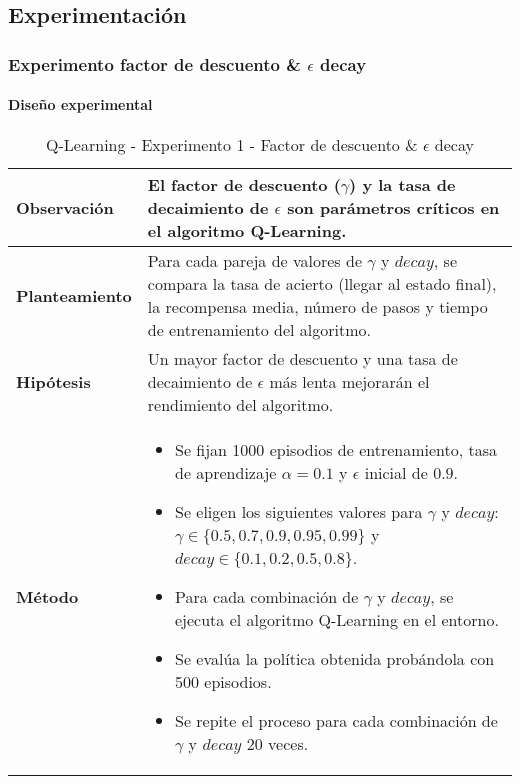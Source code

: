 \subsection{Experimentación}

\subsubsection{Experimento factor de descuento \& \(\epsilon\) decay}

\paragraph{Diseño experimental}

\begin{table}[H]
    \centering
    \begin{tabularx}{\textwidth}{|p{4cm}|X|} %
        \hline %
        \textbf{Observación} & El factor de descuento ($\gamma$) y la tasa de decaimiento de $\epsilon$ son parámetros críticos en el algoritmo Q-Learning. 
        \\ \hline 
        \textbf{Planteamiento} & Para cada pareja de valores de $\gamma$ y $decay$, se compara la tasa de acierto (llegar al estado final), la recompensa media, número de pasos y tiempo de entrenamiento del algoritmo.
        \\ \hline 
        \textbf{Hipótesis} & Un mayor factor de descuento y una tasa de decaimiento de $\epsilon$ más lenta mejorarán el rendimiento del algoritmo.
        \\ \hline 
        \textbf{Método} & 
        \begin{itemize}
            \item Se fijan 1000 episodios de entrenamiento, tasa de aprendizaje \(\alpha = 0.1\) y \(\epsilon\) inicial de $0.9$.
            \item Se eligen los siguientes valores para \(\gamma\) y $decay$: \(\gamma \in \{0.5, 0.7, 0.9, 0.95, 0.99\}\) y $decay \in \{0.1, 0.2, 0.5, 0.8\}$.
            \item Para cada combinación de \(\gamma\) y $decay$, se ejecuta el algoritmo Q-Learning en el entorno.
            \item Se evalúa la política obtenida probándola con 500 episodios.
            \item Se repite el proceso para cada combinación de \(\gamma\) y $decay$ 20 veces.
        \end{itemize}
        \\ \hline
    \end{tabularx}
    \caption{Q-Learning - Experimento 1 - Factor de descuento \& $\epsilon$ decay}
    \label{tab:diseñoQLEarningExp1}
\end{table}

